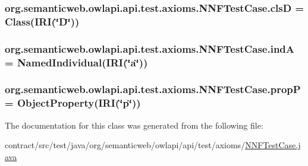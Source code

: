 \hypertarget{classorg_1_1semanticweb_1_1owlapi_1_1api_1_1test_1_1axioms_1_1_n_n_f_test_case_a29b6e97964b9759c705da7661720cd67}{
\subsubsection[{cls\-D}]{ org.\-semanticweb.\-owlapi.\-api.\-test.\-axioms.\-N\-N\-F\-Test\-Case.\-cls\-D = Class({\bf I\-R\-I}(\char`\"{}D\char`\"{}))\hspace{0.3cm}{\ttfamily [private]}}}\label{classorg_1_1semanticweb_1_1owlapi_1_1api_1_1test_1_1axioms_1_1_n_n_f_test_case_a29b6e97964b9759c705da7661720cd67}
\hypertarget{classorg_1_1semanticweb_1_1owlapi_1_1api_1_1test_1_1axioms_1_1_n_n_f_test_case_a55f801bd06704e8df61bc11c28141942}{
\subsubsection[{ind\-A}]{ org.\-semanticweb.\-owlapi.\-api.\-test.\-axioms.\-N\-N\-F\-Test\-Case.\-ind\-A = Named\-Individual({\bf I\-R\-I}(\char`\"{}a\char`\"{}))\hspace{0.3cm}{\ttfamily [private]}}}\label{classorg_1_1semanticweb_1_1owlapi_1_1api_1_1test_1_1axioms_1_1_n_n_f_test_case_a55f801bd06704e8df61bc11c28141942}
\hypertarget{classorg_1_1semanticweb_1_1owlapi_1_1api_1_1test_1_1axioms_1_1_n_n_f_test_case_a4db4a8593ff6ad582e7a3fc125b3f005}{
\subsubsection[{prop\-P}]{ org.\-semanticweb.\-owlapi.\-api.\-test.\-axioms.\-N\-N\-F\-Test\-Case.\-prop\-P = Object\-Property({\bf I\-R\-I}(\char`\"{}p\char`\"{}))\hspace{0.3cm}{\ttfamily [private]}}}\label{classorg_1_1semanticweb_1_1owlapi_1_1api_1_1test_1_1axioms_1_1_n_n_f_test_case_a4db4a8593ff6ad582e7a3fc125b3f005}


The documentation for this class was generated from the following file\-:\begin{DoxyCompactItemize}
\item 
contract/src/test/java/org/semanticweb/owlapi/api/test/axioms/\hyperlink{_n_n_f_test_case_8java}{N\-N\-F\-Test\-Case.\-java}\end{DoxyCompactItemize}
